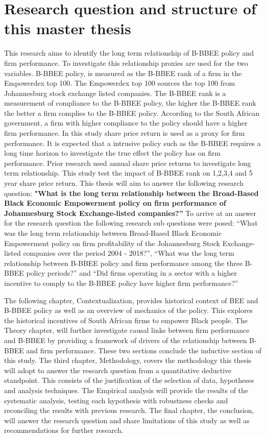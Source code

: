 \section{Research question and structure of this master thesis}
This research aims to identify the long term relationship of B-BBEE policy and firm performance. To investigate this relationship proxies are used for the two variables. B-BBEE policy, is measured as the B-BBEE rank of a firm in the Empowerdex top 100. The Empowerdex top 100 sources the top 100 from Johannesburg stock exchange listed companies. The B-BBEE rank is a measurement of compliance to the B-BBEE policy, the higher the B-BBEE rank the better a firm complies to the B-BBEE policy. According to the South African government, a firm with higher compliance to the policy should have a higher firm performance. In this study share price return is used as a proxy for firm performance. It is expected that a intrusive policy such as the B-BBEE requires a long time horizon to investigate the true effect the policy has on firm performance. Prior research used annual share price returns to investigate long term relationship. This study test the impact of B-BBEE rank on 1,2,3,4 and 5 year share price return. This thesis will aim to answer the following research question: \textbf{ "What is the long term relationship between the Broad-Based Black Economic Empowerment policy on firm performance of Johannesburg Stock Exchange-listed companies?”}  To arrive at an answer for the research question the following research sub questions were posed: “What was the long term relationship between Broad-Based Black Economic Empowerment policy on firm profitability of the Johannesburg Stock Exchange-listed companies over the period 2004 - 2018?”, “What was the long term relationship between B-BBEE policy and firm performance among the three B-BBEE policy periods?” and  “Did firms operating in a sector with a higher incentive to comply to the B-BBEE policy have higher firm performance?”

The following chapter, Contextualization, provides historical context of BEE and B-BBEE policy as well as an overview of mechanics of the policy. This explores the historical incentives of South African firms to empower Black people. The Theory chapter, will further investigate causal links between firm performance and B-BBEE by providing a framework of drivers of the relationship between B-BBEE and firm performance. These two sections conclude the inductive section of this study. The third chapter, Methodology,  covers the methodology this thesis will adopt to answer the research question from a quantitative deductive standpoint. This consists of the justification of the selection of data, hypotheses and analysis techniques. The Empirical analysis will provide the results of the systematic analysis, testing each hypothesis with robustness checks and reconciling the results with previous research. The final chapter, the conclusion, will answer the research question and share limitations of this study as well as recommendations for further research.
